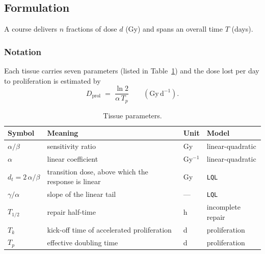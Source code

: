 \documentclass[preprint,12pt,number]{elsarticle}
\begin{document}
\subsection{Formulation} \label{sec:formulation}
A course delivers $n$ fractions of dose $d$ (Gy) and spans an overall time $T$ (days).

\subsubsection{Notation}
Each tissue carries seven parameters (listed in Table~\ref{tab:notation}) and the dose lost per day to proliferation is estimated by
    \begin{equation}
    D_\mathrm{prol} \;=\; \frac{\ln 2}{\alpha\,T_p} \qquad (\mathrm{Gy\,d^{-1}}).
    \label{eq:dprol}
    \end{equation}
    
    \begin{table}
    \centering
    \small
    \begin{tabular}{@{}llll@{}}
    \toprule
    Symbol & Meaning & Unit & Model \\
    \midrule
    $\alpha/\beta$ & sensitivity ratio & Gy & linear-quadratic \\
    $\alpha$ & linear coefficient & Gy$^{-1}$ & linear-quadratic \\
    $d_t = 2\,\alpha/\beta$ & transition dose, above which the response is linear & Gy & \texttt{LQL} \\
    $\gamma/\alpha$ & slope of the linear tail & --- & \texttt{LQL} \\
    $T_{1/2}$ & repair half-time & h & incomplete repair \\
    $T_k$ & kick-off time of accelerated proliferation & d & proliferation \\
    $T_p$ & effective doubling time & d & proliferation \\
    \bottomrule
    \end{tabular}
    \caption{Tissue parameters.}
    \label{tab:notation}
    \end{table}
\end{document}
